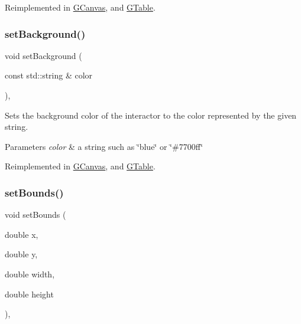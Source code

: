 Reimplemented in \mbox{\hyperlink{classGCanvas_a427fefbbc34e39e5df27a807da488e0d}{G\+Canvas}}, and \mbox{\hyperlink{classGTable_ac45b8a90f31752385a98a034a58547c7}{G\+Table}}.

\mbox{\label{classGInteractor_ab4677ab2474e68b07aa56605af92a84a}} 
\subsubsection{\texorpdfstring{set\+Background()}{setBackground()}\hspace{0.1cm}{\footnotesize\ttfamily [2/2]}}
{\footnotesize\ttfamily void set\+Background (\begin{DoxyParamCaption}\item[{const std\+::string \&}]{color }\end{DoxyParamCaption})\hspace{0.3cm}{\ttfamily [virtual]}, {\ttfamily [inherited]}}



Sets the background color of the interactor to the color represented by the given string. 


\begin{DoxyParams}{Parameters}
{\em color} & a string such as \char`\"{}blue\char`\"{} or \char`\"{}\#7700ff\char`\"{} \\
\hline
\end{DoxyParams}


Reimplemented in \mbox{\hyperlink{classGCanvas_a222fcfb542aa6094c7e0de671bd69627}{G\+Canvas}}, and \mbox{\hyperlink{classGTable_a222fcfb542aa6094c7e0de671bd69627}{G\+Table}}.

\mbox{\label{classGInteractor_a2aae8197624b72265ab83b4f1bc73f2f}} 
\subsubsection{\texorpdfstring{set\+Bounds()}{setBounds()}\hspace{0.1cm}{\footnotesize\ttfamily [1/2]}}
{\footnotesize\ttfamily void set\+Bounds (\begin{DoxyParamCaption}\item[{double}]{x,  }\item[{double}]{y,  }\item[{double}]{width,  }\item[{double}]{height }\end{DoxyParamCaption})\hspace{0.3cm}{\ttfamily [virtual]}, {\ttfamily [inherited]}}



